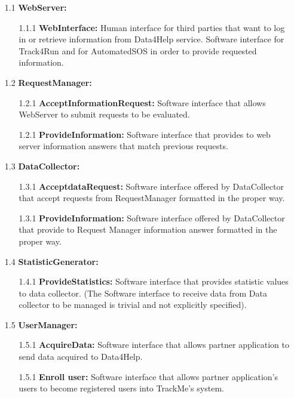 \begin{enumerate}

\item[1.1] \textbf{WebServer: }
	\begin{enumerate}
		\item[1.1.1] \textbf{WebInterface:} Human interface for third parties that want to log in or retrieve information from Data4Help service. Software interface for Track4Run and for AutomatedSOS in order to provide requested information.
	\end{enumerate}
	
\item[1.2] \textbf{RequestManager: }
	\begin{enumerate}
		\item[1.2.1] \textbf{AcceptInformationRequest:} Software interface that allows WebServer to submit requests to be evaluated.
		\item[1.2.1] \textbf{ProvideInformation:} Software interface that provides to web server information answers that match previous requests.
	\end{enumerate}

\item[1.3] \textbf{DataCollector: }
	\begin{enumerate}
		\item[1.3.1] \textbf{AcceptdataRequest:} Software interface offered by DataCollector that accept requests from RequestManager formatted in the proper way.
		\item[1.3.1] \textbf{ProvideInformation:} Software interface offered by DataCollector that provide to Request Manager information answer formatted in the proper way.
	\end{enumerate}
	
\item[1.4] \textbf{StatisticGenerator: }
	\begin{enumerate}
		\item[1.4.1] \textbf{ProvideStatistics:} Software interface that provides statistic values to data collector. (The Software interface to receive data from Data collector to be managed is trivial and not explicitly specified).
	\end{enumerate}
	
\item[1.5] \textbf{UserManager: }
	\begin{enumerate}
		\item[1.5.1] \textbf{AcquireData:} Software interface that allows partner application to send data acquired to Data4Help.
		\item[1.5.1] \textbf{Enroll user:} Software interface that allows partner application's users to become registered users into TrackMe's system.
	\end{enumerate}


\end{enumerate}
